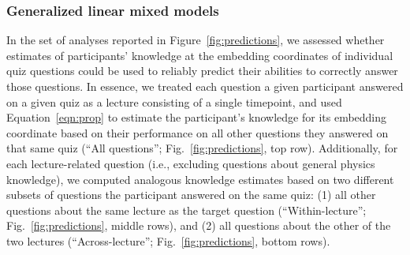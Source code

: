 \documentclass[10pt]{article}
\begin{document}
\subsubsection*{Generalized linear mixed models}\label{subsec:glmm}

In the set of analyses reported in Figure~\ref{fig:predictions}, we assessed
whether estimates of participants' knowledge at the embedding coordinates of
individual quiz questions could be used to reliably predict their abilities to
correctly answer those questions. In essence, we treated each question a given
participant answered on a given quiz as a lecture consisting of a single
timepoint, and used Equation~\ref{eqn:prop} to estimate the participant's
knowledge for its embedding coordinate based on their performance on all
other questions they answered on that same quiz (``All questions'';
Fig.~\ref{fig:predictions}, top row). Additionally, for each lecture-related
question (i.e., excluding questions about general physics knowledge), we
computed analogous knowledge estimates based on two different subsets of
questions the participant answered on the same quiz: (1) all other
questions about the same lecture as the target question (``Within-lecture'';
Fig.~\ref{fig:predictions}, middle rows), and (2) all questions about the other
of the two lectures (``Across-lecture''; Fig.~\ref{fig:predictions},
bottom rows).
\end{document}
